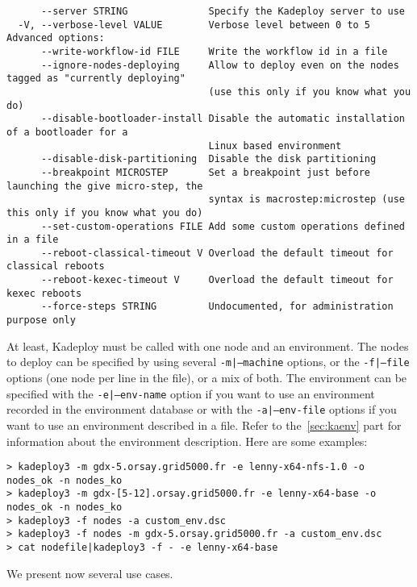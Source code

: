 \documentclass[a4wide,10pt,oneside]{book}
\begin{document}
\begin{small}
\begin{verbatim}
      --server STRING              Specify the Kadeploy server to use
  -V, --verbose-level VALUE        Verbose level between 0 to 5
Advanced options:
      --write-workflow-id FILE     Write the workflow id in a file
      --ignore-nodes-deploying     Allow to deploy even on the nodes tagged as "currently deploying" 
                                   (use this only if you know what you do)
      --disable-bootloader-install Disable the automatic installation of a bootloader for a 
                                   Linux based environment
      --disable-disk-partitioning  Disable the disk partitioning
      --breakpoint MICROSTEP       Set a breakpoint just before launching the give micro-step, the 
                                   syntax is macrostep:microstep (use this only if you know what you do)
      --set-custom-operations FILE Add some custom operations defined in a file
      --reboot-classical-timeout V Overload the default timeout for classical reboots
      --reboot-kexec-timeout V     Overload the default timeout for kexec reboots
      --force-steps STRING         Undocumented, for administration purpose only

\end{verbatim}
\end{small}

At least, Kadeploy must be called with one node and an environment. The nodes to deploy can be specified by using several \texttt{-m|--machine} options, or the \texttt{-f|--file} options (one node per line in the file), or a mix of both.
The environment can be specified with the \texttt{-e|--env-name} option if you want to use an environment recorded in the environment database or with the \texttt{-a|--env-file} options if you want to use an environment described in a file. Refer to the~\ref{sec:kaenv} part for information about the environment description. Here are some examples:
\begin{verbatim}
> kadeploy3 -m gdx-5.orsay.grid5000.fr -e lenny-x64-nfs-1.0 -o nodes_ok -n nodes_ko
> kadeploy3 -m gdx-[5-12].orsay.grid5000.fr -e lenny-x64-base -o nodes_ok -n nodes_ko
> kadeploy3 -f nodes -a custom_env.dsc
> kadeploy3 -f nodes -m gdx-5.orsay.grid5000.fr -a custom_env.dsc
> cat nodefile|kadeploy3 -f - -e lenny-x64-base
\end{verbatim}

We present now several use cases.
\end{document}
